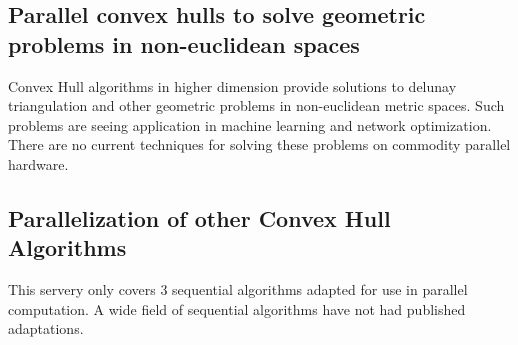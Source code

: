 \documentclass[10pt,a4paper]{report}
\begin{document}
\subsection{Parallel convex hulls to solve geometric problems in non-euclidean spaces}

Convex Hull algorithms in higher dimension provide solutions to delunay triangulation and other geometric problems in non-euclidean metric spaces. Such problems are seeing application in machine learning and network optimization. There are no current techniques for solving these problems on commodity parallel hardware.

\subsection{Parallelization of other Convex Hull Algorithms}
This servery only covers 3 sequential algorithms adapted for use in parallel computation. A wide field of sequential algorithms have not had published adaptations. 

















	
\end{document}
